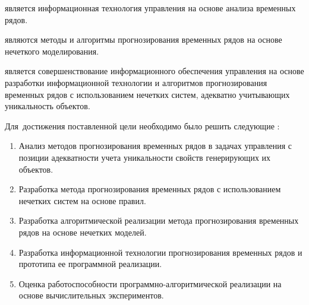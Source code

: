 {\researchObject} является информационная технология управления на основе анализа временных рядов.

{\researchSubject} являются методы и алгоритмы прогнозирования временных рядов на основе нечеткого моделирования.

{\aim} является совершенствование информационного обеспечения управления на основе разработки информационной технологии и алгоритмов прогнозирования временных рядов с использованием нечетких систем, адекватно учитывающих уникальность объектов.

Для~достижения поставленной цели необходимо было решить следующие {\tasks}:
\begin{enumerate}[beginpenalty=10000] %
  \item Анализ методов прогнозирования временных рядов в задачах управления с позиции адекватности учета уникальности свойств генерирующих их объектов.
  \item Разработка метода прогнозирования временных рядов с использованием нечетких систем на основе правил. %
  \item Разработка алгоритмической реализации метода прогнозирования временных рядов на основе нечетких моделей.
  \item Разработка информационной технологии прогнозирования временных рядов и прототипа ее программной реализации.
  \item Оценка работоспособности программно-алгоритмической реализации на основе вычислительных экспериментов.
\end{enumerate}

